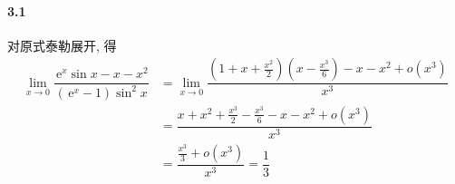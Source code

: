 \paragraph*{3.1} 

对原式泰勒展开, 得
\[
	\begin{aligned}
\lim_{x\to 0}\dfrac{\,\mathrm{e}^{x}\sin x-x-x^2}{\left(\,\mathrm{e}^x-1\right)\sin^2 x}&=\lim_{x\to 0}\dfrac{\left(1+x+\frac{x^2}{2}\right)(x-\frac{x^3}{6})-x-x^2+o\left(x^3\right)}{x^3}\\
&=\dfrac{x+x^2+\frac{x^3}{2}-\frac{x^3}{6}-x-x^2+o\left(x^3\right)}{x^3}\\
&=\dfrac{\frac{x^3}{3}+o\left(x^3\right)}{x^3}=\dfrac{1}{3}
	\end{aligned}
\]